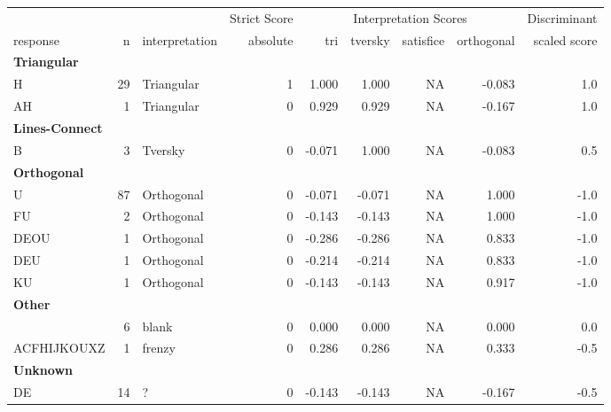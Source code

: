 \documentclass[
  letterpaper,
  DIV=11,
  numbers=noendperiod]{scrreprt}
\begin{document}
\begin{tabular}[t]{l|r|l|r|r|r|r|r|r}
\hline
\multicolumn{3}{c|}{ } & \multicolumn{1}{c|}{Strict Score} & \multicolumn{4}{c|}{Interpretation Scores} & \multicolumn{1}{c}{Discriminant} \\
\cline{4-4} \cline{5-8} \cline{9-9}
response & n & interpretation & absolute & tri & tversky & satisfice & orthogonal & scaled score\\
\hline
\multicolumn{9}{l}{\textbf{Triangular}}\\
\hline
\hspace{1em}H & 29 & Triangular & 1 & 1.000 & 1.000 & NA & -0.083 & 1.0\\
\hline
\hspace{1em}AH & 1 & Triangular & 0 & 0.929 & 0.929 & NA & -0.167 & 1.0\\
\hline
\multicolumn{9}{l}{\textbf{Lines-Connect}}\\
\hline
\hspace{1em}B & 3 & Tversky & 0 & -0.071 & 1.000 & NA & -0.083 & 0.5\\
\hline
\multicolumn{9}{l}{\textbf{Orthogonal}}\\
\hline
\hspace{1em}U & 87 & Orthogonal & 0 & -0.071 & -0.071 & NA & 1.000 & -1.0\\
\hline
\hspace{1em}FU & 2 & Orthogonal & 0 & -0.143 & -0.143 & NA & 1.000 & -1.0\\
\hline
\hspace{1em}DEOU & 1 & Orthogonal & 0 & -0.286 & -0.286 & NA & 0.833 & -1.0\\
\hline
\hspace{1em}DEU & 1 & Orthogonal & 0 & -0.214 & -0.214 & NA & 0.833 & -1.0\\
\hline
\hspace{1em}KU & 1 & Orthogonal & 0 & -0.143 & -0.143 & NA & 0.917 & -1.0\\
\hline
\multicolumn{9}{l}{\textbf{Other}}\\
\hline
\hspace{1em} & 6 & blank & 0 & 0.000 & 0.000 & NA & 0.000 & 0.0\\
\hline
\hspace{1em}ACFHIJKOUXZ & 1 & frenzy & 0 & 0.286 & 0.286 & NA & 0.333 & -0.5\\
\hline
\multicolumn{9}{l}{\textbf{Unknown}}\\
\hline
\hspace{1em}DE & 14 & ? & 0 & -0.143 & -0.143 & NA & -0.167 & -0.5\\

\end{tabular}
\end{document}
